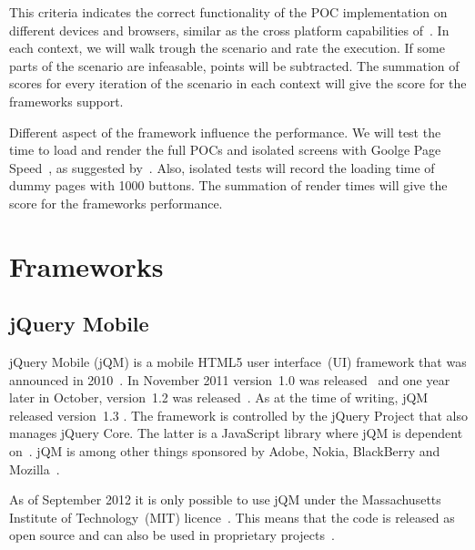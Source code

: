 \documentclass[a4paper]{artikel3}
\renewcommand{\paragraph}[1]{\vspace{2mm} \noindent {\bf #1}  }
\begin{document}
\paragraph{Support}
This criteria indicates the correct functionality of the POC implementation on different devices and browsers,  similar as the cross platform capabilities of~\cite{Sarrafi2012a}.  
In each context,  we will walk trough the scenario and rate the execution.  
If some parts of the scenario are infeasable,  points will be subtracted.  
The summation of scores for every iteration of the scenario in each context will give the score for the frameworks support.

\paragraph{Performance}
Different aspect of the framework influence the performance.  
We will test the time to load and render the full POCs and isolated screens with Goolge Page Speed~\cite{Google2012},  as suggested by~\cite{Morgan2011}.   
Also,  isolated tests will record the loading time of dummy pages with 1000 buttons.  
The summation of render times will give the score for the frameworks performance.

\section{Frameworks} %
\label{sec:frameworks}

\subsection{jQuery Mobile} %
\label{sec:jqm}

jQuery Mobile (jQM) is a mobile HTML5 user interface~(UI) framework that was announced in 2010~\cite{Resig2010}. 
In November 2011 version~1.0 was released~\cite{Parker2011} and one year later in October, version~1.2 was released~\cite{Parker2012}. 
As at the time of writing, jQM released version~1.3 \cite{Parker2013a}.
The framework is controlled by the jQuery Project that also manages jQuery Core. 
The latter is a JavaScript library where jQM is dependent on~\cite{JQuery2012}. 
jQM is among other things sponsored by Adobe, Nokia, BlackBerry and Mozilla~\cite{JQuery2012a}.

\paragraph{Licence}
As of September 2012 it is only possible to use jQM under the Massachusetts Institute of Technology~(MIT) licence~\cite{Dmethvin2012}. 
This means that the code is released as open source and can also be used in proprietary projects~\cite{PhilDutson2012}.
\end{document}
